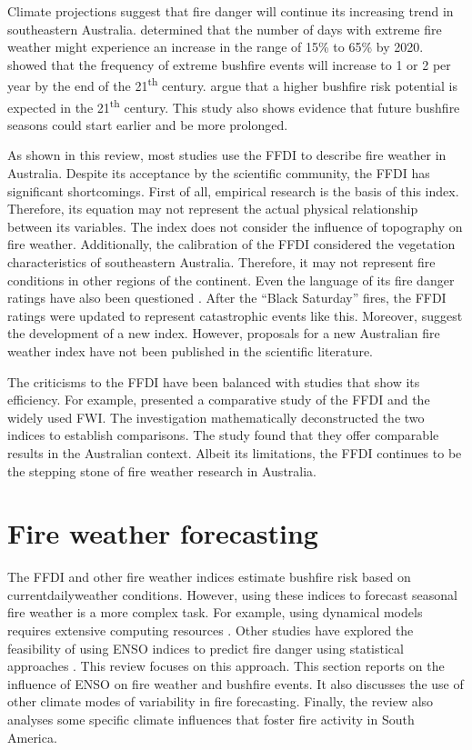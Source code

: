 Climate projections suggest that fire danger will continue its increasing
trend in southeastern Australia. \citet{Lucas2007} determined that
the number of days with extreme fire weather might experience an increase
in the range of 15\% to 65\% by 2020. \citet{Hasson2009} showed that
the frequency of extreme bushfire events will increase to 1 or 2 per
year by the end of the 21\textsuperscript{th} century. \citet{Clarke2011}
argue that a higher bushfire risk potential is expected in the 21\textsuperscript{th }century.
This study also shows evidence that future bushfire seasons could
start earlier and be more prolonged. 

As shown in this review, most studies use the FFDI to describe fire
weather in Australia. Despite its acceptance by the scientific community,
the FFDI has significant shortcomings. First of all, empirical research
is the basis of this index. Therefore, its equation may not represent
the actual physical relationship between its variables. The index
does not consider the influence of topography on fire weather. Additionally,
the calibration of the FFDI considered the vegetation characteristics
of southeastern Australia. Therefore, it may not represent fire conditions
in other regions of the continent. Even the language of its fire danger
ratings have also been questioned \citep{Teague2010}. After the ``Black
Saturday'' fires, the FFDI ratings were updated to represent catastrophic
events like this. Moreover, \citet{Teague2010} suggest the development
of a new index. However, proposals for a new Australian fire weather
index have not been published in the scientific literature. 

The criticisms to the FFDI have been balanced with studies that show
its efficiency. For example, \citet{Dowdy2009} presented a comparative
study of the FFDI and the widely used FWI. The investigation mathematically
deconstructed the two indices to establish comparisons. The study
found that they offer comparable results in the Australian context.
Albeit its limitations, the FFDI continues to be the stepping stone
of fire weather research in Australia. 


\section{Fire weather forecasting }

The FFDI and other fire weather indices estimate bushfire risk based
on current\textemdash daily\textemdash weather conditions. However,
using these indices to forecast seasonal fire weather is a more complex
task. For example, using dynamical models requires extensive computing
resources \citep{Roads2005}. Other studies have explored the feasibility
of using ENSO indices to predict fire danger using statistical approaches
\citep{Kitzberger2002,Nicholls2007,Harris2013}. This review focuses
on this approach. This section reports on the influence of ENSO on
fire weather and bushfire events. It also discusses the use of other
climate modes of variability in fire forecasting. Finally, the review
also analyses some specific climate influences that foster fire activity
in South America. 

